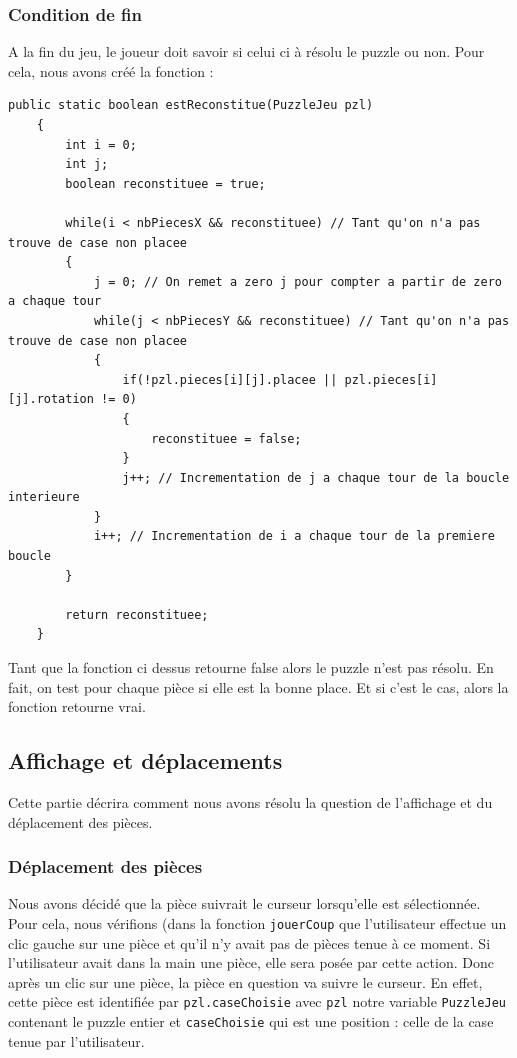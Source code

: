 \documentclass[]{article}
\newcommand{\variable}[1]{\noindent \texttt{#1}}
\begin{document}
\subsubsection{Condition de fin}

A la fin du jeu, le joueur doit savoir si celui ci à résolu le puzzle ou non. Pour cela, nous avons créé la fonction : 
\begin{lstlisting}
public static boolean estReconstitue(PuzzleJeu pzl)
    {
        int i = 0;
        int j;
        boolean reconstituee = true;

        while(i < nbPiecesX && reconstituee) // Tant qu'on n'a pas trouve de case non placee
        {
            j = 0; // On remet a zero j pour compter a partir de zero a chaque tour
            while(j < nbPiecesY && reconstituee) // Tant qu'on n'a pas trouve de case non placee
            {
                if(!pzl.pieces[i][j].placee || pzl.pieces[i][j].rotation != 0)
                {
                    reconstituee = false;
                }
                j++; // Incrementation de j a chaque tour de la boucle interieure
            }
            i++; // Incrementation de i a chaque tour de la premiere boucle
        }

        return reconstituee;
    }
\end{lstlisting}

Tant que la fonction ci dessus retourne false alors le puzzle n'est pas résolu. En fait, on test pour chaque pièce si elle est la bonne place. Et si c'est le cas, alors la fonction retourne vrai. 




\subsection{Affichage et déplacements}

Cette partie décrira comment nous avons résolu la question de l'affichage et du déplacement des pièces.

\subsubsection{Déplacement des pièces}

Nous avons décidé que la pièce suivrait le curseur lorsqu'elle est sélectionnée. Pour cela, nous vérifions (dans la fonction \variable{jouerCoup} que l'utilisateur effectue un clic gauche sur une pièce et qu'il n'y avait pas de pièces tenue à ce moment. Si l'utilisateur avait dans la main une pièce, elle sera posée par cette action. Donc après un clic sur une pièce, la pièce en question va suivre le curseur. En effet, cette pièce est identifiée par \variable{pzl.caseChoisie} avec \variable{pzl} notre variable \variable{PuzzleJeu} contenant le puzzle entier et \variable{caseChoisie} qui est une position : celle de la case tenue par l'utilisateur.
\end{document}
